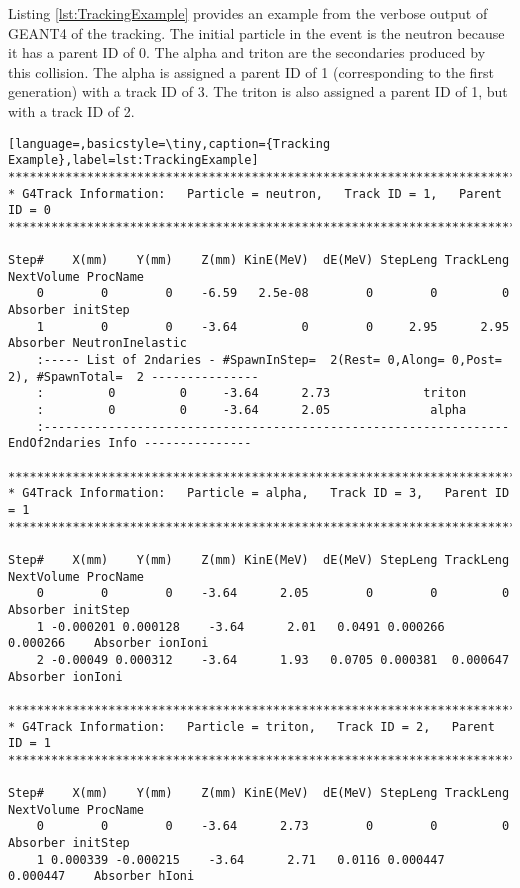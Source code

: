 Listing \ref{lst:TrackingExample} provides an example from the verbose output of GEANT4 of the tracking.
The initial particle in the event is the neutron because it has a parent ID of 0.
The alpha and triton are the secondaries produced by this collision. 
The alpha is assigned a parent ID of 1 (corresponding to the first generation) with a track ID of 3.
The triton is also assigned a parent ID of 1, but with a track ID of 2.
\begin{lstlisting}[language=,basicstyle=\tiny,caption={Tracking Example},label=lst:TrackingExample]
*********************************************************************************************************
* G4Track Information:   Particle = neutron,   Track ID = 1,   Parent ID = 0
*********************************************************************************************************

Step#    X(mm)    Y(mm)    Z(mm) KinE(MeV)  dE(MeV) StepLeng TrackLeng  NextVolume ProcName
    0        0        0    -6.59   2.5e-08        0        0         0    Absorber initStep
    1        0        0    -3.64         0        0     2.95      2.95    Absorber NeutronInelastic
    :----- List of 2ndaries - #SpawnInStep=  2(Rest= 0,Along= 0,Post= 2), #SpawnTotal=  2 ---------------
    :         0         0     -3.64      2.73             triton
    :         0         0     -3.64      2.05              alpha
    :----------------------------------------------------------------- EndOf2ndaries Info ---------------

*********************************************************************************************************
* G4Track Information:   Particle = alpha,   Track ID = 3,   Parent ID = 1
*********************************************************************************************************

Step#    X(mm)    Y(mm)    Z(mm) KinE(MeV)  dE(MeV) StepLeng TrackLeng  NextVolume ProcName
    0        0        0    -3.64      2.05        0        0         0    Absorber initStep
    1 -0.000201 0.000128    -3.64      2.01   0.0491 0.000266  0.000266    Absorber ionIoni
    2 -0.00049 0.000312    -3.64      1.93   0.0705 0.000381  0.000647    Absorber ionIoni

*********************************************************************************************************
* G4Track Information:   Particle = triton,   Track ID = 2,   Parent ID = 1
*********************************************************************************************************

Step#    X(mm)    Y(mm)    Z(mm) KinE(MeV)  dE(MeV) StepLeng TrackLeng  NextVolume ProcName
    0        0        0    -3.64      2.73        0        0         0    Absorber initStep
    1 0.000339 -0.000215    -3.64      2.71   0.0116 0.000447  0.000447    Absorber hIoni
\end{lstlisting}


